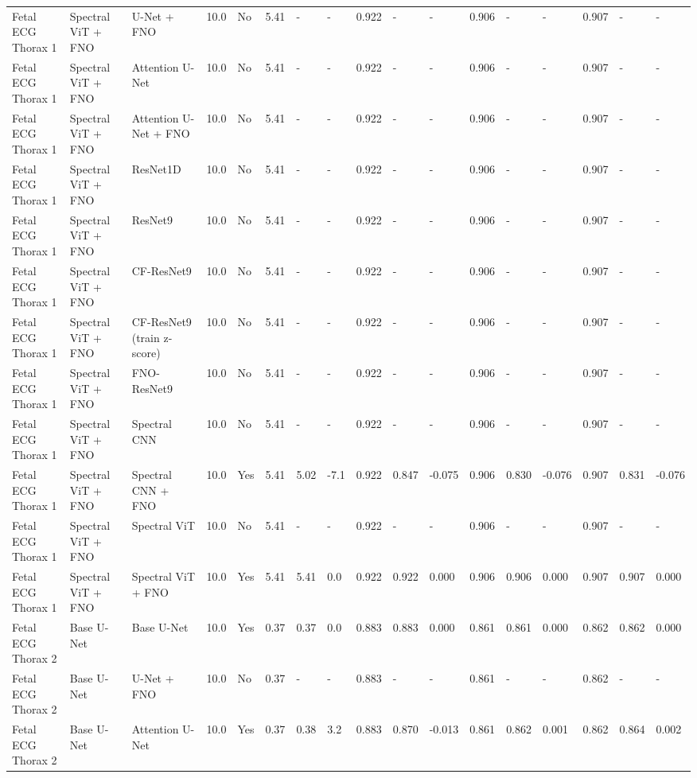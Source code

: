 \begin{longtable}{lllllllllllllllll}
Fetal ECG Thorax 1 & Spectral ViT + FNO & U-Net + FNO & 10.0 & No & 5.41 & - & - & 0.922 & - & - & 0.906 & - & - & 0.907 & - & - \\
Fetal ECG Thorax 1 & Spectral ViT + FNO & Attention U-Net & 10.0 & No & 5.41 & - & - & 0.922 & - & - & 0.906 & - & - & 0.907 & - & - \\
Fetal ECG Thorax 1 & Spectral ViT + FNO & Attention U-Net + FNO & 10.0 & No & 5.41 & - & - & 0.922 & - & - & 0.906 & - & - & 0.907 & - & - \\
Fetal ECG Thorax 1 & Spectral ViT + FNO & ResNet1D & 10.0 & No & 5.41 & - & - & 0.922 & - & - & 0.906 & - & - & 0.907 & - & - \\
Fetal ECG Thorax 1 & Spectral ViT + FNO & ResNet9 & 10.0 & No & 5.41 & - & - & 0.922 & - & - & 0.906 & - & - & 0.907 & - & - \\
Fetal ECG Thorax 1 & Spectral ViT + FNO & CF-ResNet9 & 10.0 & No & 5.41 & - & - & 0.922 & - & - & 0.906 & - & - & 0.907 & - & - \\
Fetal ECG Thorax 1 & Spectral ViT + FNO & CF-ResNet9 (train z-score) & 10.0 & No & 5.41 & - & - & 0.922 & - & - & 0.906 & - & - & 0.907 & - & - \\
Fetal ECG Thorax 1 & Spectral ViT + FNO & FNO-ResNet9 & 10.0 & No & 5.41 & - & - & 0.922 & - & - & 0.906 & - & - & 0.907 & - & - \\
Fetal ECG Thorax 1 & Spectral ViT + FNO & Spectral CNN & 10.0 & No & 5.41 & - & - & 0.922 & - & - & 0.906 & - & - & 0.907 & - & - \\
Fetal ECG Thorax 1 & Spectral ViT + FNO & Spectral CNN + FNO & 10.0 & Yes & 5.41 & 5.02 & -7.1 & 0.922 & 0.847 & -0.075 & 0.906 & 0.830 & -0.076 & 0.907 & 0.831 & -0.076 \\
Fetal ECG Thorax 1 & Spectral ViT + FNO & Spectral ViT & 10.0 & No & 5.41 & - & - & 0.922 & - & - & 0.906 & - & - & 0.907 & - & - \\
Fetal ECG Thorax 1 & Spectral ViT + FNO & Spectral ViT + FNO & 10.0 & Yes & 5.41 & 5.41 & 0.0 & 0.922 & 0.922 & 0.000 & 0.906 & 0.906 & 0.000 & 0.907 & 0.907 & 0.000 \\
Fetal ECG Thorax 2 & Base U-Net & Base U-Net & 10.0 & Yes & 0.37 & 0.37 & 0.0 & 0.883 & 0.883 & 0.000 & 0.861 & 0.861 & 0.000 & 0.862 & 0.862 & 0.000 \\
Fetal ECG Thorax 2 & Base U-Net & U-Net + FNO & 10.0 & No & 0.37 & - & - & 0.883 & - & - & 0.861 & - & - & 0.862 & - & - \\
Fetal ECG Thorax 2 & Base U-Net & Attention U-Net & 10.0 & Yes & 0.37 & 0.38 & 3.2 & 0.883 & 0.870 & -0.013 & 0.861 & 0.862 & 0.001 & 0.862 & 0.864 & 0.002 \\

\end{longtable}
